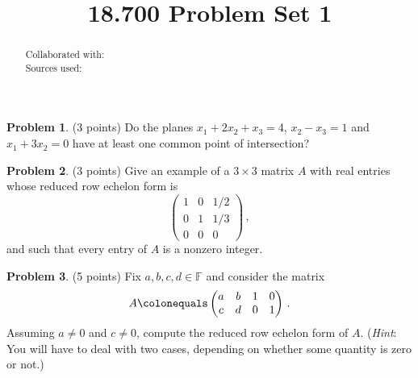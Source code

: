 \documentclass[reqno, 12pt]{amsart}
\theoremstyle{definition}
\newenvironment{problab}[1]
{\noindent\textbf{Problem #1}.}
{\vskip 6pt}
\theoremstyle{remark}
\newcommand{\F}{\mathbb F}
\renewcommand{\abstractname}{}    %
\begin{document}

\title{18.700 Problem Set 1}

\maketitle

\begin{abstract}
  \noindent Collaborated with:\\
  Sources used: 
\end{abstract}
\vskip 0.5cm

\begin{problab}{1} (3 points)
  Do the planes $x_1 + 2 x_2 + x_3 = 4$, $x_2 - x_3 = 1$ and $x_1 + 3 x_2 = 0$ have at least one common point of intersection?
\end{problab}

\begin{problab}{2} (3 points)
  Give an example of a $3 \times 3$ matrix $A$ with real entries whose reduced row echelon form is
  \begin{equation*}
    \begin{pmatrix}
      1 & 0 & 1/2\\
      0 & 1 & 1/3\\
      0 & 0 & 0
    \end{pmatrix} \, ,
  \end{equation*}
and such that every entry of $A$ is a nonzero integer.
\end{problab}

\begin{problab}{3} (5 points)
  Fix $a,b,c,d \in \F$ and consider the matrix
  \begin{equation*}
    A \colonequals
    \begin{pmatrix}
      a & b & 1 & 0\\
      c & d & 0 & 1
    \end{pmatrix} \, .
  \end{equation*}
  Assuming $a \neq 0$ and $c \neq 0$, compute the reduced row echelon form of $A$. (\textit{Hint}: You will have to deal with two cases, depending on whether some quantity is zero or not.)
\end{problab}
\end{document}
